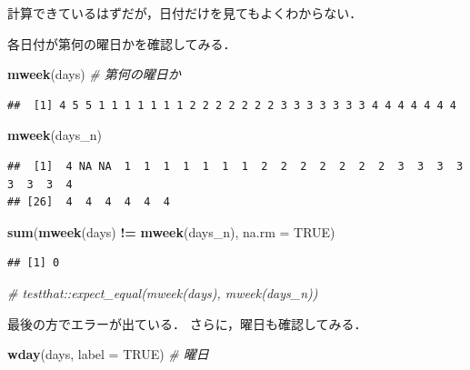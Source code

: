 \documentclass[
]{article}
\newenvironment{Shaded}{\begin{snugshade}}{\end{snugshade}}
\newcommand{\AttributeTok}[1]{\textcolor[rgb]{0.13,0.29,0.53}{#1}}
\newcommand{\CommentTok}[1]{\textcolor[rgb]{0.56,0.35,0.01}{\textit{#1}}}
\newcommand{\ConstantTok}[1]{\textcolor[rgb]{0.56,0.35,0.01}{#1}}
\newcommand{\FunctionTok}[1]{\textcolor[rgb]{0.13,0.29,0.53}{\textbf{#1}}}
\newcommand{\NormalTok}[1]{#1}
\newcommand{\SpecialCharTok}[1]{\textcolor[rgb]{0.81,0.36,0.00}{\textbf{#1}}}
\begin{document}
計算できているはずだが，日付だけを見てもよくわからない．

各日付が第何の曜日かを確認してみる．

\begin{Shaded}
\begin{Highlighting}[]
\FunctionTok{mweek}\NormalTok{(days)   }\CommentTok{\# 第何の曜日か}
\end{Highlighting}
\end{Shaded}

\begin{verbatim}
##  [1] 4 5 5 1 1 1 1 1 1 1 2 2 2 2 2 2 2 3 3 3 3 3 3 3 4 4 4 4 4 4 4
\end{verbatim}

\begin{Shaded}
\begin{Highlighting}[]
\FunctionTok{mweek}\NormalTok{(days\_n)}
\end{Highlighting}
\end{Shaded}

\begin{verbatim}
##  [1]  4 NA NA  1  1  1  1  1  1  1  2  2  2  2  2  2  2  3  3  3  3  3  3  3  4
## [26]  4  4  4  4  4  4
\end{verbatim}

\begin{Shaded}
\begin{Highlighting}[]
\FunctionTok{sum}\NormalTok{(}\FunctionTok{mweek}\NormalTok{(days) }\SpecialCharTok{!=} \FunctionTok{mweek}\NormalTok{(days\_n), }\AttributeTok{na.rm =} \ConstantTok{TRUE}\NormalTok{)}
\end{Highlighting}
\end{Shaded}

\begin{verbatim}
## [1] 0
\end{verbatim}

\begin{Shaded}
\begin{Highlighting}[]
  \CommentTok{\# testthat::expect\_equal(mweek(days), mweek(days\_n))}
\end{Highlighting}
\end{Shaded}

最後の方でエラーが出ている．
さらに，曜日も確認してみる．

\begin{Shaded}
\begin{Highlighting}[]
\FunctionTok{wday}\NormalTok{(days, }\AttributeTok{label =} \ConstantTok{TRUE}\NormalTok{)   }\CommentTok{\# 曜日}
\end{Highlighting}
\end{Shaded}
\end{document}
